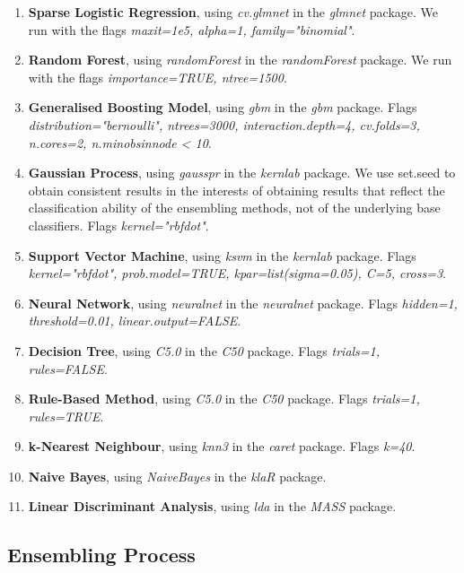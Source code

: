 \documentclass{bmcart}
\begin{document}
\begin{enumerate}

    \item \textbf{Sparse Logistic Regression}, using \textit{cv.glmnet} in the \textit{glmnet} package. We run with the flags \textit{maxit=1e5, alpha=1, family="binomial"}.
    \item \textbf{Random Forest}, using \textit{randomForest} in the \textit{randomForest} package. We run with the flags \textit{importance=TRUE, ntree=1500}.
    \item \textbf{Generalised Boosting Model}, using \textit{gbm} in the \textit{gbm} package. Flags \textit{distribution="bernoulli", ntrees=3000, interaction.depth=4, cv.folds=3, n.cores=2, n.minobsinnode < 10}.
    \item \textbf{Gaussian Process}, using \textit{gausspr} in the \textit{kernlab} package. We use set.seed to obtain consistent results in the interests of obtaining results that reflect the classification ability of the ensembling methods, not of the underlying base classifiers. Flags \textit{kernel="rbfdot"}.
    \item \textbf{Support Vector Machine}, using \textit{ksvm} in the \textit{kernlab} package. Flags \textit{kernel="rbfdot", prob.model=TRUE, kpar=list(sigma=0.05), C=5, cross=3}.
    \item \textbf{Neural Network}, using \textit{neuralnet} in the \textit{neuralnet} package. Flags \textit{hidden=1, threshold=0.01, linear.output=FALSE}.
    \item \textbf{Decision Tree}, using \textit{C5.0} in the \textit{C50} package. Flags \textit{trials=1, rules=FALSE}.
    \item \textbf{Rule-Based Method}, using \textit{C5.0} in the \textit{C50} package. Flags \textit{trials=1, rules=TRUE}.
    \item \textbf{k-Nearest Neighbour}, using \textit{knn3} in the \textit{caret} package. Flags \textit{k=40}.
    \item \textbf{Naive Bayes}, using \textit{NaiveBayes} in the \textit{klaR} package.
    \item \textbf{Linear Discriminant Analysis}, using \textit{lda} in the  \textit{MASS} package. 
\end{enumerate}


\subsection*{Ensembling Process}
\label{ensemblingprocess}
\end{document}
